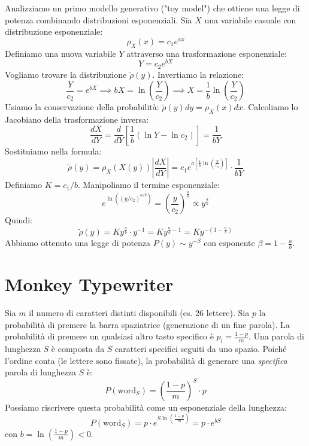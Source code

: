 Analizziamo un primo modello generativo ("toy model") che ottiene una legge di potenza combinando distribuzioni esponenziali.
Sia $X$ una variabile casuale con distribuzione esponenziale:
\begin{equation}
    \rho_X(x) = c_1 e^{ax}
\end{equation}
Definiamo una nuova variabile $Y$ attraverso una trasformazione esponenziale:
\begin{equation}
    Y = c_2 e^{bX}
\end{equation}
Vogliamo trovare la distribuzione $\tilde{\rho}(y)$.
Invertiamo la relazione:
\begin{equation}
    \frac{Y}{c_2} = e^{bX} \implies bX = \ln\left(\frac{Y}{c_2}\right) \implies X = \frac{1}{b} \ln\left(\frac{Y}{c_2}\right)
\end{equation}
Usiamo la conservazione della probabilità: $\tilde{\rho}(y) dy = \rho_X(x) dx$.
Calcoliamo lo Jacobiano della trasformazione inversa:
\begin{equation}
    \frac{dX}{dY} = \frac{d}{dY} \left[ \frac{1}{b} (\ln Y - \ln c_2) \right] = \frac{1}{bY}
\end{equation}
Sostituiamo nella formula:
\begin{equation}
    \tilde{\rho}(y) = \rho_X(X(y)) \left| \frac{dX}{dY} \right| = c_1 e^{a \left[ \frac{1}{b} \ln\left(\frac{y}{c_2}\right) \right]} \cdot \frac{1}{bY}
\end{equation}
Definiamo $K = c_1/b$. Manipoliamo il termine esponenziale:
\begin{equation}
    e^{\ln\left( (y/c_2)^{a/b} \right)} = \left( \frac{y}{c_2} \right)^{\frac{a}{b}} \propto y^{\frac{a}{b}}
\end{equation}
Quindi:
\begin{equation}
    \tilde{\rho}(y) = K y^{\frac{a}{b}} \cdot y^{-1} = K y^{\frac{a}{b} - 1} = K y^{-\left(1 - \frac{a}{b}\right)}
\end{equation}
Abbiamo ottenuto una legge di potenza $P(y) \sim y^{-\beta}$ con esponente $\beta = 1 - \frac{a}{b}$.

\section{Monkey Typewriter}
Sia $m$ il numero di caratteri distinti disponibili (es. 26 lettere).
Sia $p$ la probabilità di premere la barra spaziatrice (generazione di un fine parola).
La probabilità di premere un qualsiasi altro tasto specifico è $p_l = \frac{1-p}{m}$. Una parola di lunghezza $S$ è composta da $S$ caratteri specifici seguiti da uno spazio. Poiché l'ordine conta (le lettere sono fissate), la probabilità di generare una \textit{specifica} parola di lunghezza $S$ è:
\begin{equation}
    P(\text{word}_S) = \left( \frac{1-p}{m} \right)^S \cdot p
\end{equation}
Possiamo riscrivere questa probabilità come un esponenziale della lunghezza:
\begin{equation}
    P(\text{word}_S) = p \cdot e^{S \ln\left(\frac{1-p}{m}\right)} = p \cdot  e^{bS}
\end{equation}
con $b = \ln\left(\frac{1-p}{m}\right) < 0$.


